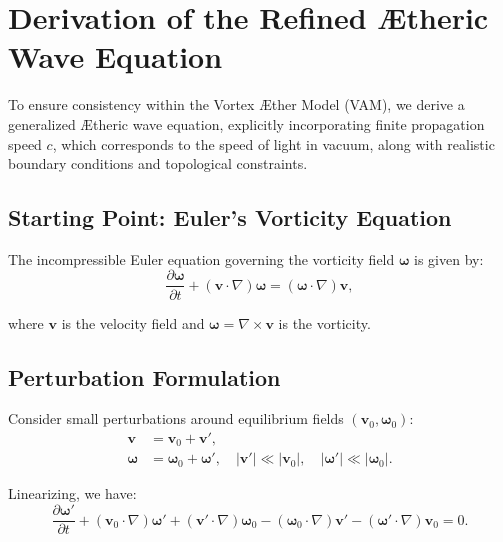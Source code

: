 

\section{Derivation of the Refined Ætheric Wave Equation}


To ensure consistency within the Vortex Æther Model (VAM), we derive a generalized Ætheric wave equation, explicitly incorporating finite propagation speed $c$, which corresponds to the speed of light in vacuum, along with realistic boundary conditions and topological constraints.


\subsection{Starting Point: Euler's Vorticity Equation}


The incompressible Euler equation governing the vorticity field $\boldsymbol{\omega}$ is given by:
\begin{equation}
    \frac{\partial \boldsymbol{\omega}}{\partial t} + (\mathbf{v}\cdot\nabla)\boldsymbol{\omega} = (\boldsymbol{\omega}\cdot\nabla)\mathbf{v},
\end{equation}


where $\mathbf{v}$ is the velocity field and $\boldsymbol{\omega} = \nabla \times \mathbf{v}$ is the vorticity.


\subsection{Perturbation Formulation}


Consider small perturbations around equilibrium fields $(\mathbf{v}_0, \boldsymbol{\omega}_0)$:
\begin{align}
    \mathbf{v} &= \mathbf{v}_0 + \mathbf{v}', \\
    \boldsymbol{\omega} &= \boldsymbol{\omega}_0 + \boldsymbol{\omega}', \quad |\mathbf{v}'| \ll |\mathbf{v}_0|, \quad |\boldsymbol{\omega}'| \ll |\boldsymbol{\omega}_0|.
\end{align}


Linearizing, we have:
\begin{equation}
    \frac{\partial \boldsymbol{\omega}'}{\partial t} + (\mathbf{v}_0 \cdot \nabla)\boldsymbol{\omega}' + (\mathbf{v}' \cdot \nabla)\boldsymbol{\omega}_0 - (\boldsymbol{\omega}_0\cdot\nabla)\mathbf{v}' - (\boldsymbol{\omega}'\cdot\nabla)\mathbf{v}_0 = 0.
\end{equation}



